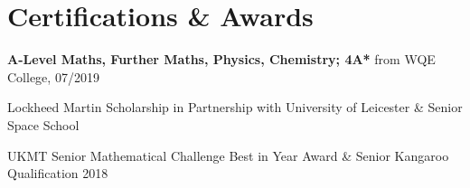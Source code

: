 \documentclass[a4paper]{article}
\begin{document}
\section{Certifications \& Awards}
\textbf{A-Level Maths, Further Maths, Physics, Chemistry; 4A*} from WQE College, 07/2019

Lockheed Martin Scholarship in Partnership with University of Leicester \& Senior Space School

UKMT Senior Mathematical Challenge Best in Year Award \& Senior Kangaroo Qualification 2018

\thispagestyle{empty}
\end{document}
